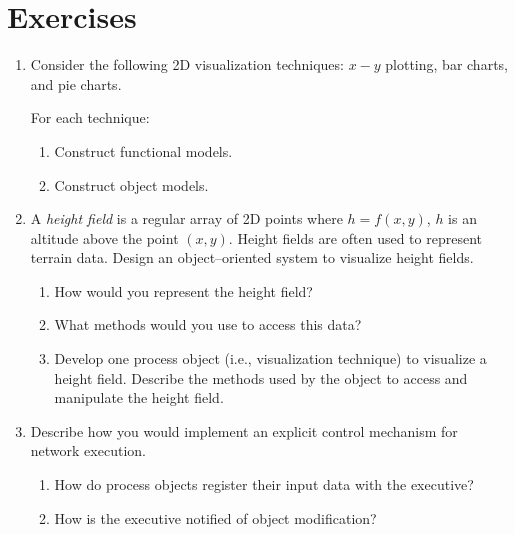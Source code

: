 \section{Exercises}
\begin{enumerate}

\item Consider the following 2D visualization techniques: $x-y$ plotting, bar charts, and pie charts.

For each technique:

\begin{enumerate}

    \item Construct functional models.

    \item Construct object models.

\end{enumerate}

    \item \label{ex:ch04_4.2} A \emph{height field} is a regular array of 2D points where $h = f(x,y)$, $h$ is an altitude above the point $(x,y)$. Height fields are often used to represent terrain data. Design an object--oriented system to visualize height fields.

\begin{enumerate}

    \item How would you represent the height field?

    \item What methods would you use to access this data?

    \item Develop one process object (i.e., visualization technique) to visualize a height field. Describe the methods used by the object to access and manipulate the height field.

\end{enumerate}

\item Describe how you would implement an explicit control mechanism for network execution.

\begin{enumerate}

    \item How do process objects register their input data with the executive?

    \item How is the executive notified of object modification?


\end{enumerate}
\end{enumerate}
